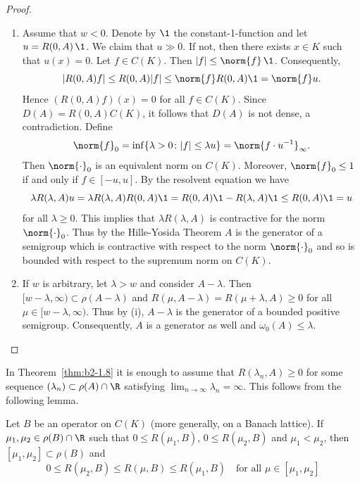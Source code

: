 \begin{proof} 
\begin{enumerate}[\upshape (i), wide, labelindent=.25em]
\item \label{thm:b2-1.8-1}
Assume that $w < 0$.
Denote by $\1$ the constant-1-function and let $u = R(0,A)\,\1$.
We claim that $u \gg 0$.
If not, then there exists $x \in K$ such that $u(x) = 0$.
Let $f \in C(K)$.
Then $|f| \leq \norm{f} \, \1$.
Consequently, 
%
\[
	\vert R(0,A)f \vert \leq R(0,A)|f| \leq \norm{f}R(0,A)\1 = \norm{f}u.
\]
%
Hence $(R(0,A)f)(x) = 0$ for all $f \in C(K)$.
Since $D(A) = R(0,A)C(K)$, it follows that $D(A)$ is not dense, a contradiction.
Define 
\[\norm{f}_{0} = \inf \{\lambda > 0 \colon |f| \leq \lambda u\} = \norm{f \cdot u^{-1} }_{\infty}.
\]
Then $\norm{\cdot}_{0}$ is an equivalent norm on $C(K)$.
Moreover, $\norm{f}_{0} \leq 1$ if and only if\/ $f \in [-u,u]$.
By the resolvent equation we have 
\[
\lambda R(\lambda,A)u = \lambda R(\lambda,A)R(0,A)\1 = R(0,A)\1 - R(\lambda,A)\1 \leq R(0,A)\1 = u 
\]
for all $\lambda \geq 0$.
This implies that $\lambda R(\lambda,A)$ is contractive for the norm $\norm{\cdot}_{0}$.
Thus by the Hille-Yosida Theorem $A$ is the generator of a semigroup which is contractive with respect to the norm $\norm{\cdot}_{0}$ and so is bounded with respect to the supremum norm on $C(K)$.

\item \label{thm:b2-1.8-2}
If\/ $w$ is arbitrary, let $\lambda > w$ and consider $A - \lambda$.
Then $[w-\lambda,\infty) \subset \rho(A-\lambda)$ and $R(\mu,A-\lambda) = R(\mu+\lambda,A) \geq 0$ for all $\mu \in [w-\lambda,\infty)$.
Thus by (i), $A - \lambda$ is the generator of a bounded positive semigroup.
Consequently, $A$ is a generator as well and $\omega_{0}(A) \leq \lambda$.
\end{enumerate}
\end{proof}
In Theorem~\ref{thm:b2-1.8} it is enough to assume that $R(\lambda_{n},A) \geq 0$ for some sequence 
 $(\lambda_{n}) \subset \rho(A) \cap \R$ satisfying $\lim_{n \to \infty} \lambda_{n} = \infty$.
This follows from the following lemma.
\begin{lemma}\label{lem:b2-1.9}
Let $B$ be an operator on $C(K)$ (more generally, on a Banach lattice).
If\/ $\mu_{1}, \mu_{2} \in \rho(B) \cap \R$ such that $0 \leq R(\mu_{1},B)$, $0 \leq R(\mu_{2},B)$ and $\mu_{1} < \mu_{2}$, then $[\mu_{1},\mu_{2}] \subset \rho(B)$ and
\[
    0 \leq R(\mu_{2},B) \leq R(\mu,B) \leq R(\mu_{1},B) \quad \text{for all } \mu \in [\mu_{1},\mu_{2}]
\]
\end{lemma}
